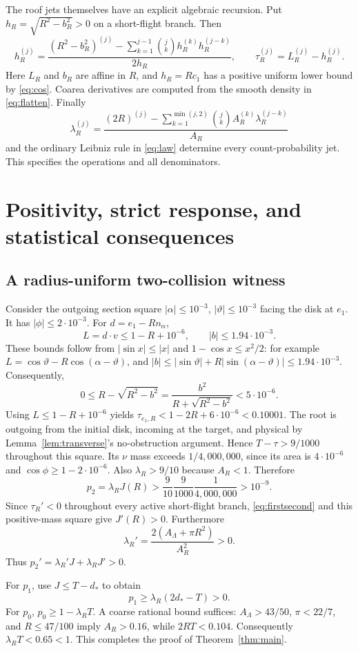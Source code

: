 \documentclass[11pt,reqno]{amsart}
\numberwithin{equation}{section}
\theoremstyle{remark}\newtheorem{remark}[theorem]{Remark}
\begin{document}
The roof jets themselves have an explicit algebraic recursion. Put $h_R=\sqrt{R^2-b_R^2}>0$ on a short-flight branch. Then
\[
 h_R^{(j)}=\frac{(R^2-b_R^2)^{(j)}-
 \sum_{k=1}^{j-1}\binom jk h_R^{(k)}h_R^{(j-k)}}{2h_R},
 \qquad \tau_R^{(j)}=L_R^{(j)}-h_R^{(j)}.
\]
Here $L_R$ and $b_R$ are affine in $R$, and $h_R=Rc_1$ has a positive uniform lower bound by \eqref{eq:cos}. Coarea derivatives are computed from the smooth density in \eqref{eq:flatten}. Finally
\[
 \lambda_R^{(j)}=\frac{(2R)^{(j)}-
 \sum_{k=1}^{\min(j,2)}\binom jk A_R^{(k)}\lambda_R^{(j-k)}}{A_R}
\]
and the ordinary Leibniz rule in \eqref{eq:law} determine every count-probability jet. This specifies the operations and all denominators.

\section{Positivity, strict response, and statistical consequences}
\subsection{A radius-uniform two-collision witness}
Consider the outgoing section square $|\alpha|\le10^{-3}$, $|\vartheta|\le10^{-3}$ facing the disk at $e_1$. It has $|\phi|\le2\cdot10^{-3}$. For $d=e_1-Rn_\alpha$,
\[
 L=d\cdot v\le1-R+10^{-6},\qquad
 |b|\le1.94\cdot10^{-3}.
\]
These bounds follow from $|\sin x|\le|x|$ and $1-\cos x\le x^2/2$: for example
$L=\cos\vartheta-R\cos(\alpha-\vartheta)$, and
$|b|\le |\sin\vartheta|+R|\sin(\alpha-\vartheta)|\le1.94\cdot10^{-3}$. Consequently,
\[
 0\le R-\sqrt{R^2-b^2}
 =\frac{b^2}{R+\sqrt{R^2-b^2}}<5\cdot10^{-6}.
\]
Using $L\le1-R+10^{-6}$ yields
$\tau_{e_1,R}<1-2R+6\cdot10^{-6}<0.10001$.
The root is outgoing from the initial disk, incoming at the target, and physical by Lemma~\ref{lem:transverse}'s no-obstruction argument. Hence $T-\tau>9/1000$ throughout this square. Its $\nu$ mass exceeds $1/4{,}000{,}000$, since its area is $4\cdot10^{-6}$ and $\cos\phi\ge1-2\cdot10^{-6}$. Also $\lambda_R>9/10$ because $A_R<1$. Therefore
\[
 p_2=\lambda_RJ(R)>
 \frac9{10}\frac9{1000}\frac1{4{,}000{,}000}>10^{-9}.
\]
Since $\tau_R'<0$ throughout every active short-flight branch, \eqref{eq:firstsecond} and this positive-mass square give $J'(R)>0$. Furthermore
\[
 \lambda_R'=\frac{2(A_\Lambda+\pi R^2)}{A_R^2}>0.
\]
Thus $p_2'=\lambda_R'J+\lambda_RJ'>0$.

For $p_1$, use $J\le T-d_*$ to obtain
\[
 p_1\ge\lambda_R(2d_*-T)>0.
\]
For $p_0$, $p_0\ge1-\lambda_RT$. A coarse rational bound suffices: $A_\Lambda>43/50$, $\pi<22/7$, and $R\le47/100$ imply $A_R>0.16$, while $2RT<0.104$. Consequently $\lambda_RT<0.65<1$. This completes the proof of Theorem~\ref{thm:main}.
\end{document}
